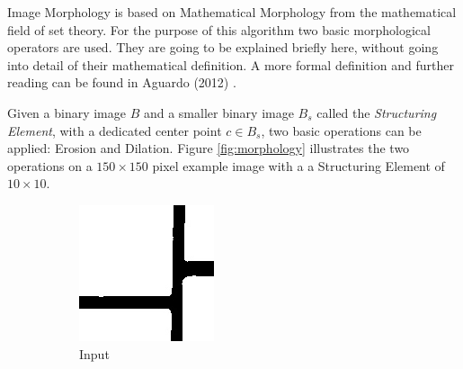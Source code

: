 \documentclass[serif,article,noparskip]{agse-thesis}
\begin{document}
Image Morphology is based on Mathematical Morphology from the mathematical field
of set theory. For the purpose of this algorithm two basic morphological
operators are used. They are going to be explained briefly here, without
going into detail of their mathematical definition. A more formal definition and
further reading can be found in Aguardo (2012) \cite{Aguardo2012}.

Given a binary image $B$ and a smaller binary image $B_s$ called the
\textit{Structuring Element}, with a dedicated center point $c \in B_s$, two
basic operations can be applied: Erosion and Dilation. Figure \ref{fig:morphology}
illustrates the two operations on a $150 \times 150$ pixel example image with a
a Structuring Element of $10 \times 10$.

\begin{figure}
\centering
\begin{subfigure}{.3\textwidth}
  \centering
  \includegraphics[width=\linewidth]{images/example.jpg}
  \caption{Input}
  \label{fig:input}
\end{subfigure}%
\begin{subfigure}{.3\textwidth}
  \centering

\end{subfigure}
\end{figure}
\end{document}
